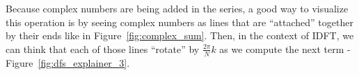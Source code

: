 \documentclass[titlepage]{article}
\begin{document}
    \begin{figure}[H]
      \caption{}\label{fig}
      \centering
      \hfill
    \end{figure}
    Because complex numbers are being added in the series, a good way to visualize
    this operation is by seeing complex numbers as lines that are ``attached'' together
    by their ends like in Figure~\ref{fig:complex_sum}. Then, in the context of 
    IDFT, we can think that each of those lines ``rotate'' by $\frac{2\pi}{N}k$ as we 
    compute the next term - Figure~\ref{fig:dfs_explainer_3}. 
    \begin{figure}[H]
      \caption{}\label{f}
      \centering
      \hfill
    \end{figure}
\end{document}
